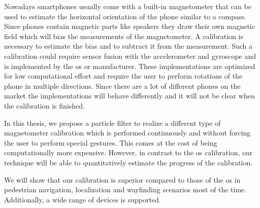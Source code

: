 Nowadays smartphones usually come with a built-in magnetometer that can be used to estimate the horizontal orientation of the phone similar to a compass. Since phones contain magnetic parts like speakers they draw their own magnetic field which will bias the measurements of the magnetometer. A calibration is necessary to estimate the bias and to subtract it from the measurement. Such a calibration could require sensor fusion with the accelerometer and gyroscope and is implemented by the \gls{os} or manufacturer. These implementations are optimized for low computational effort and require the user to perform rotations of the phone in multiple directions. Since there are a lot of different phones on the market the implementations will behave differently and it will not be clear when the calibration is finished.

In this thesis, we propose a particle filter to realize a different type of magnetometer calibration which is performed continuously and without forcing the user to perform special gestures. This comes at the cost of being computationally more expensive. However, in contrast to the \gls{os} calibration, our technique will be able to quantitatively estimate the progress of the calibration.

We will show that our calibration is superior compared to those of the \gls{os} in pedestrian navigation, localization and wayfinding scenarios most of the time. Additionally, a wide range of devices is supported.

